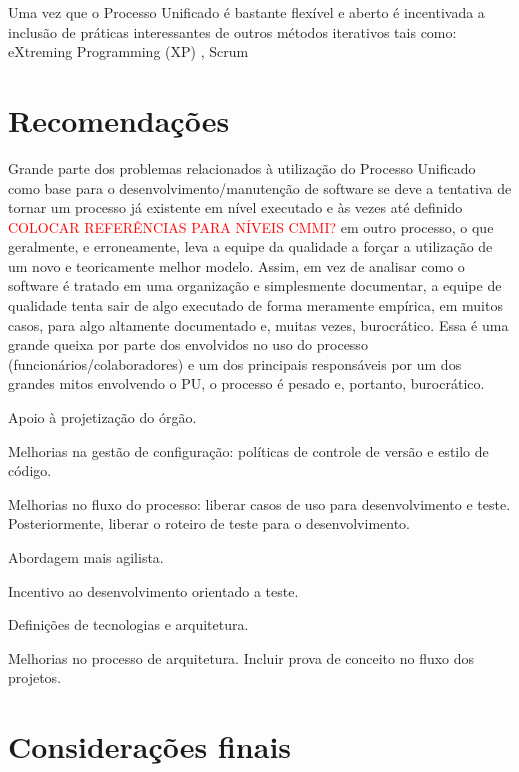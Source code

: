 \documentclass[
	article,			%
	11pt,				%
	oneside,			%
	a4paper,			%
	english,			%
	brazil,				%
	sumario=tradicional
	]{abntex2}
\begin{document}
Uma vez que o Processo Unificado é bastante flexível e aberto é incentivada a
inclusão de práticas interessantes de outros métodos iterativos tais como:
eXtreming Programming (XP) \cite{Beck:1999:ECE:619045.621348}, Scrum
\cite{schwaber2002agile}

\section{Recomendações}

Grande parte dos problemas relacionados à utilização do Processo Unificado como
base para o desenvolvimento/manutenção de software se deve a tentativa de tornar
um processo já existente em nível executado e às vezes até definido
\textcolor{red}{COLOCAR REFERÊNCIAS PARA NÍVEIS CMMI?} em outro processo, o que
geralmente, e erroneamente, leva a equipe da qualidade a forçar a utilização de
um novo e teoricamente melhor modelo. Assim, em vez de analisar como o software
é tratado em uma organização e simplesmente documentar, a equipe de qualidade
tenta sair de algo executado de forma meramente empírica, em muitos casos, para
algo altamente documentado e, muitas vezes, burocrático. Essa é uma grande
queixa por parte dos envolvidos no uso do processo (funcionários/colaboradores)
e um dos principais responsáveis por um dos grandes mitos envolvendo o PU, o
processo é pesado e, portanto, burocrático.



Apoio à projetização
do órgão.

Melhorias na gestão de configuração: políticas de controle de versão e estilo de
código.

Melhorias no fluxo do processo: liberar casos de uso para desenvolvimento e
teste. Posteriormente, liberar o roteiro de teste para o desenvolvimento.

Abordagem mais agilista.

Incentivo ao desenvolvimento  orientado a teste.

Definições de tecnologias e arquitetura.

Melhorias no processo de arquitetura. Incluir prova de conceito no fluxo dos
projetos.

% 

\section*{Considerações finais}
\end{document}
